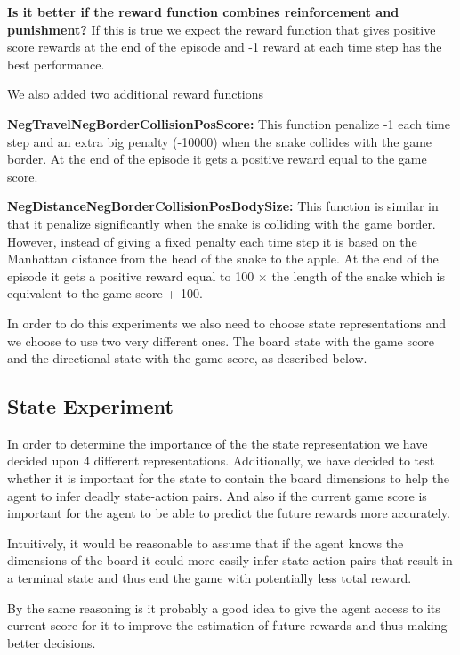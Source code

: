 \documentclass[report.tex]{subfiles}
\begin{document}
    \textbf{Is it better if the reward function combines reinforcement and punishment?} If this is true we expect the reward function that gives positive score rewards at the end of the episode and -1 reward at each time step has the best performance.

    We also added two additional reward functions

    \textbf{NegTravelNegBorderCollisionPosScore:} This function penalize -1 each time step and an extra big penalty (-10000) when the snake collides with the game border. At the end of the episode it gets a positive reward equal to the game score.

    \textbf{NegDistanceNegBorderCollisionPosBodySize:} This function is similar in that it penalize significantly when the snake is colliding with the game border. However, instead of giving a fixed penalty each time step it is based on the Manhattan distance from the head of the snake to the apple. At the end of the episode it gets a positive reward equal to 100 $\times$ the length of the snake which is equivalent to the game score + 100.

    In order to do this experiments we also need to choose state representations and we choose to use two very different ones. The board state with the game score and the directional state with the game score, as described below.

    \subsection*{State Experiment}

    In order to determine the importance of the the state representation we have decided upon 4 different representations. Additionally, we have decided to test whether it is important for the state to contain the board dimensions to help the agent to infer deadly state-action pairs. And also if the current game score is important for the agent to be able to predict the future rewards more accurately.

    Intuitively, it would be reasonable to assume that if the agent knows the dimensions of the board it could more easily infer state-action pairs that result in a terminal state and thus end the game with potentially less total reward.

    By the same reasoning is it probably a good idea to give the agent access to its current score for it to improve the estimation of future rewards and thus making better decisions.
\end{document}
